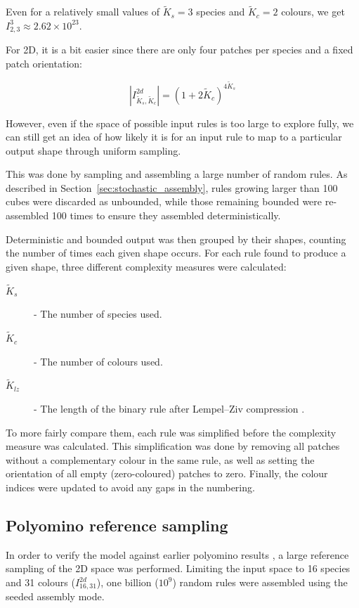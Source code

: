 Even for a relatively small values of \(\widetilde{K}_s=3\) species and \(\widetilde{K}_c=2\) colours, we get \(I_{2, 3}^3 \approx 2.62 \times 10^{23}\).

For 2D, it is a bit easier since there are only four patches per species and a fixed patch orientation:

\[
\left\lvert I_{\widetilde{K}_s, \widetilde{K}_c}^{2d}\right\rvert = (1+2\widetilde{K}_c)^{4\widetilde{K}_s}
\]

However, even if the space of possible input rules is too large to explore fully, we can still get an idea of how likely it is for an input rule to map to a particular output shape through uniform sampling.

This was done by sampling and assembling a large number of random rules. As described in Section~\ref{sec:stochastic_assembly}, rules growing larger than 100 cubes were discarded as unbounded, while those remaining bounded were re-assembled 100 times to ensure they assembled deterministically. 

Deterministic and bounded output was then grouped by their shapes, counting the number of times each given shape occurs. For each rule found to produce a given shape, three different complexity measures were calculated:
\begin{description}
    \item[\(\widetilde{K}_s\)] - The number of species used.
    \item[\(\widetilde{K}_c\)] - The number of colours used.
    \item[\(\widetilde{K}_{lz}\)] - The length of the binary rule after Lempel–Ziv compression \cite{lempel-ziv}. 
\end{description}

To more fairly compare them, each rule was simplified before the complexity measure was calculated. This simplification was done by removing all patches without a complementary colour in the same rule, as well as setting the orientation of all empty (zero-coloured) patches to zero. Finally, the colour indices were updated to avoid any gaps in the numbering.

\subsection{Polyomino reference sampling}
\label{sec:refcalc}
In order to verify the model against earlier polyomino results \cite{johnston2021}, a large reference sampling of the 2D space was performed. Limiting the input space to 16 species and 31 colours (\(I_{16,31}^{2d}\)), one billion (\(10^9\)) random rules were assembled using the seeded assembly mode.


